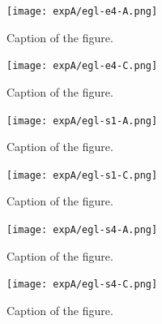 \documentclass[twoside]{ctuthesis}
\theoremstyle{plain}
\theoremstyle{definition}
\theoremstyle{note}
\begin{document}
\begin{figure}[htbp]
	\centering
	\texttt{[image: expA/egl-e4-A.png]}
	\caption{Caption of the figure.}
	\label{fig:your-figure}
\end{figure}
\begin{figure}[htbp]
	\centering
	\texttt{[image: expA/egl-e4-C.png]}
	\caption{Caption of the figure.}
	\label{fig:your-figure}
\end{figure}
\begin{figure}[htbp]
	\centering
	\texttt{[image: expA/egl-s1-A.png]}
	\caption{Caption of the figure.}
	\label{fig:your-figure}
\end{figure}
\begin{figure}[htbp]
	\centering
	\texttt{[image: expA/egl-s1-C.png]}
	\caption{Caption of the figure.}
	\label{fig:your-figure}
\end{figure}
\begin{figure}[htbp]
	\centering
	\texttt{[image: expA/egl-s4-A.png]}
	\caption{Caption of the figure.}
	\label{fig:your-figure}
\end{figure}
\begin{figure}[htbp]
	\centering
	\texttt{[image: expA/egl-s4-C.png]}
	\caption{Caption of the figure.}
	\label{fig:your-figure}
\end{figure}
\end{document}

